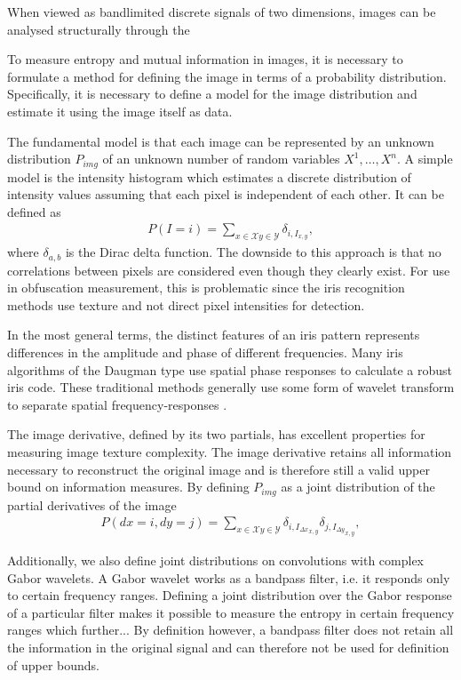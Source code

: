 When viewed as bandlimited discrete signals of two dimensions, images can be analysed structurally through the 

To measure entropy and mutual information in images, it is necessary to formulate a method for defining the image in terms of a probability distribution. Specifically, it is necessary to define a model for the image distribution and estimate it using the image itself as data.

The fundamental model is that each image can be represented by an unknown distribution $P_{img}$ of an unknown number of random variables $X^1, \dots, X^n$. A simple model is the intensity histogram which estimates a discrete distribution of intensity values assuming that each pixel is independent of each other. It can be defined as
\begin{align}
    P(I=i) = \sum_{x\in\mathcal{X}y\in\mathcal{Y}} \delta_{i, I_{x,y}},
\end{align}
where $\delta_{a, b}$ is the Dirac delta function. The downside to this approach is that no correlations between pixels are considered even though they clearly exist. For use in obfuscation measurement, this is problematic since the iris recognition methods use texture and not direct pixel intensities for detection. 

In the most general terms, the distinct features of an iris pattern represents differences in the amplitude and phase of different frequencies. Many iris algorithms of the Daugman type use spatial phase responses to calculate a robust iris code. These traditional methods generally use some form of wavelet transform to separate spatial frequency-responses \parencite{daugman2007new}. %

The image derivative, defined by its two partials, has excellent properties for measuring image texture complexity. The image derivative retains all information necessary to reconstruct the original image and is therefore still a valid upper bound on information measures. By defining $P_{img}$ as a joint distribution of the partial derivatives of the image
\begin{align}
    P(dx=i, dy=j) = \sum_{x\in\mathcal{X}y\in\mathcal{Y}} \delta_{i, {I_{\Delta x}}_{x,y}} \delta_{j, {I_{\Delta y}}_{x,y}},
\end{align}

Additionally, we also define joint distributions on convolutions with complex Gabor wavelets. A Gabor wavelet works as a bandpass filter, i.e. it responds only to certain frequency ranges. Defining a joint distribution over the Gabor response of a particular filter makes it possible to measure the entropy in certain frequency ranges which further... By definition however, a bandpass filter does not retain all the information in the original signal and can therefore not be used for definition of upper bounds.




